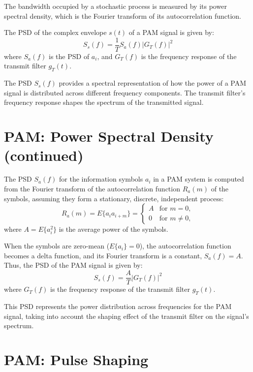 The bandwidth occupied by a stochastic process is measured by its power spectral density, which is the Fourier transform of its autocorrelation function.

The PSD of the complex envelope \( s(t) \) of a PAM signal is given by:
\[ S_s(f) = \frac{1}{T} S_a(f) |G_T(f)|^2 \]
where \( S_a(f) \) is the PSD of \( a_i \), and \( G_T(f) \) is the frequency response of the transmit filter \( g_T(t) \).

The PSD \( S_s(f) \) provides a spectral representation of how the power of a PAM signal is distributed across different frequency components. The transmit filter's frequency response shapes the spectrum of the transmitted signal.


\section*{PAM: Power Spectral Density (continued)}

The PSD \( S_a(f) \) for the information symbols \( a_i \) in a PAM system is computed from the Fourier transform of the autocorrelation function \( R_a(m) \) of the symbols, assuming they form a stationary, discrete, independent process:
\[ R_a(m) = E\{a_i a_{i+m}\} = 
\begin{cases} 
A & \text{for } m = 0, \\
0 & \text{for } m \neq 0,
\end{cases} \]
where \( A = E\{a_i^2\} \) is the average power of the symbols.

When the symbols are zero-mean (\( E\{a_i\} = 0 \)), the autocorrelation function becomes a delta function, and its Fourier transform is a constant, \( S_a(f) = A \). Thus, the PSD of the PAM signal is given by:
\[ S_s(f) = \frac{A}{T} |G_T(f)|^2 \]
where \( G_T(f) \) is the frequency response of the transmit filter \( g_T(t) \).

This PSD represents the power distribution across frequencies for the PAM signal, taking into account the shaping effect of the transmit filter on the signal's spectrum.


\section*{PAM: Pulse Shaping}

